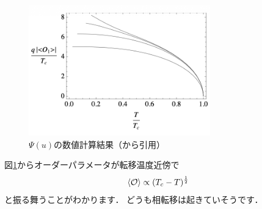 \documentclass[b5paper,11pt,dvipdfmx]{jsarticle}
\numberwithin{equation}{section}
\theoremstyle{definition}
\begin{document}
\begin{figure}[t]
    \centering
    \includegraphics[width=0.7\textwidth]{fig_kawai/order_para.png}
    \caption{$\Psi(u)$の数値計算結果（\cite{Hartnoll08b}から引用）}
    \label{fig:order_para}
\end{figure}
図\ref{fig:order_para}からオーダーパラメータが転移温度近傍で
\begin{equation}
    \ev{\mathcal{O}} \propto (T_c - T)^{\frac{1}{2}}
\end{equation}
と振る舞うことがわかります．
どうも相転移は起きていそうです．
\end{document}
